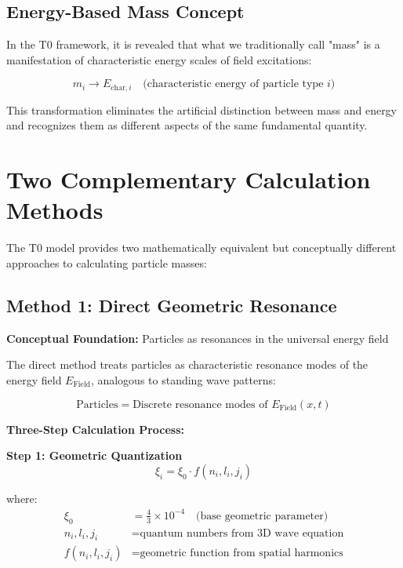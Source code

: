 \documentclass[12pt,a4paper]{article}
\newcommand{\Efield}{E_{\text{Field}}}
\begin{document}
	\subsection{Energy-Based Mass Concept}
	\label{subsec:energy_based_mass}
	
	In the T0 framework, it is revealed that what we traditionally call "mass" is a manifestation of characteristic energy scales of field excitations:
	
	\begin{equation}
		\boxed{m_i \rightarrow E_{\text{char},i} \quad \text{(characteristic energy of particle type } i\text{)}}
		\label{eq:mass_to_energy}
	\end{equation}
	
	This transformation eliminates the artificial distinction between mass and energy and recognizes them as different aspects of the same fundamental quantity.
	
	\section{Two Complementary Calculation Methods}
	\label{sec:two_calculation_methods}
	
	The T0 model provides two mathematically equivalent but conceptually different approaches to calculating particle masses:
	
	\subsection{Method 1: Direct Geometric Resonance}
	\label{subsec:direct_geometric_method}
	
	\textbf{Conceptual Foundation:} Particles as resonances in the universal energy field
	
	The direct method treats particles as characteristic resonance modes of the energy field $\Efield$, analogous to standing wave patterns:
	
	\begin{equation}
		\text{Particles} = \text{Discrete resonance modes of } \Efield(x,t)
	\end{equation}
	
	\textbf{Three-Step Calculation Process:}
	
	\textbf{Step 1: Geometric Quantization}
	\begin{equation}
		\xi_i = \xi_0 \cdot f(n_i, l_i, j_i)
		\label{eq:geometric_quantization}
	\end{equation}
	
	where:
	\begin{align}
		\xi_0 &= \frac{4}{3} \times 10^{-4} \quad \text{(base geometric parameter)} \\
		n_i, l_i, j_i &= \text{quantum numbers from 3D wave equation} \\
		f(n_i, l_i, j_i) &= \text{geometric function from spatial harmonics}
	\end{align}
	
\end{document}
